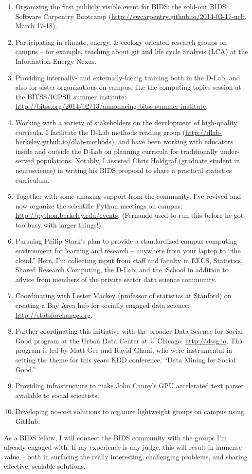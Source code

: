 \begin{enumerate}
    \item Organizing the first publicly visible event for BIDS: the sold-out
        BIDS Software Carpentry Bootcamp
        (\url{http://swcarpentry.github.io/2014-03-17-ucb}, March 17-18).
    \item Participating in climate, energy, \& ecology oriented research groups
        on campus -- for example, teaching about git and life cycle analysis
        (LCA) at the Information-Energy Nexus.
    \item Providing internally- and externally-facing training both in the
        D-Lab, and also for sister organizations on campus, like the computing
        topics session at the BITSS/ICPSR summer institute:
        \url{http://bitss.org/2014/02/13/announcing-bitss-summer-institute}.
    \item Working with a variety of stakeholders on the development of
        high-quality curricula. I facilitate the D-Lab methods reading group
        (\url{http://dlab-berkeley.github.io/dlab-methods}), and have been
        working with educators inside and outside the D-Lab on planning
        curricula for traditionally under-served populations. Notably, I
        assisted Chris Holdgraf (graduate student in neuroscience) in writing
        his BIDS proposal to share a practical statistics curriculum.
    \item Together with some amazing support from the community, I've revived
        and now organize the scientific Python meetings on campus:
        \url{http://python.berkeley.edu/events}. (Fernando used to run this before he
        got too busy with larger things!)
    \item Pursuing Philip Stark's plan to provide a standardized campus computing
        environment for learning and research -- anywhere from your laptop to
        “the cloud.” Here, I'm collecting input from staff and faculty in EECS,
        Statistics, Shared Research Computing, the D-Lab, and the iSchool in
        addition to advice from members of the private sector data science community.
    \item Coordinating with Lester Mackey (professor of statistics at Stanford)
        on creating a Bay Area hub for socially engaged data science:
        \url{http://statsforchange.org}.
    \item Further coordinating this initiative with the broader Data Science for
        Social Good program at the Urban Data Center at U Chicago:
        \url{http://dssg.io}. This program is led by Matt Gee and Rayid Ghani, who were
        instrumental in setting the theme for this years KDD conference, “Data
        Mining for Social Good.”
    \item Providing infrastructure to make John Canny's GPU accelerated text
        parser available to social scientists.
    \item Developing no-cost solutions to organize lightweight groups on campus
        using GitHub.
\end{enumerate}

As a BIDS fellow, I will connect the BIDS community  with the groups I'm already
engaged with. If my experience is any judge, this will result in immense value
-- both in surfacing the really interesting, challenging problems, and sharing
effective, scalable solutions.


